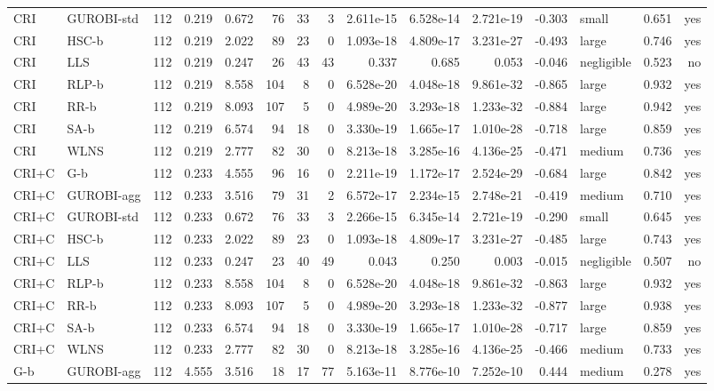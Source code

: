 \begin{table}[htbp]
\begin{tabular}{llrrrrrrrrrrlrr}
CRI & GUROBI-std & 112 & 0.219 & 0.672 & 76 & 33 & 3 & 2.611e-15 & 6.528e-14 & 2.721e-19 & -0.303 & small & 0.651 & yes \\
CRI & HSC-b & 112 & 0.219 & 2.022 & 89 & 23 & 0 & 1.093e-18 & 4.809e-17 & 3.231e-27 & -0.493 & large & 0.746 & yes \\
CRI & LLS & 112 & 0.219 & 0.247 & 26 & 43 & 43 & 0.337 & 0.685 & 0.053 & -0.046 & negligible & 0.523 & no \\
CRI & RLP-b & 112 & 0.219 & 8.558 & 104 & 8 & 0 & 6.528e-20 & 4.048e-18 & 9.861e-32 & -0.865 & large & 0.932 & yes \\
CRI & RR-b & 112 & 0.219 & 8.093 & 107 & 5 & 0 & 4.989e-20 & 3.293e-18 & 1.233e-32 & -0.884 & large & 0.942 & yes \\
CRI & SA-b & 112 & 0.219 & 6.574 & 94 & 18 & 0 & 3.330e-19 & 1.665e-17 & 1.010e-28 & -0.718 & large & 0.859 & yes \\
CRI & WLNS & 112 & 0.219 & 2.777 & 82 & 30 & 0 & 8.213e-18 & 3.285e-16 & 4.136e-25 & -0.471 & medium & 0.736 & yes \\
CRI+C & G-b & 112 & 0.233 & 4.555 & 96 & 16 & 0 & 2.211e-19 & 1.172e-17 & 2.524e-29 & -0.684 & large & 0.842 & yes \\
CRI+C & GUROBI-agg & 112 & 0.233 & 3.516 & 79 & 31 & 2 & 6.572e-17 & 2.234e-15 & 2.748e-21 & -0.419 & medium & 0.710 & yes \\
CRI+C & GUROBI-std & 112 & 0.233 & 0.672 & 76 & 33 & 3 & 2.266e-15 & 6.345e-14 & 2.721e-19 & -0.290 & small & 0.645 & yes \\
CRI+C & HSC-b & 112 & 0.233 & 2.022 & 89 & 23 & 0 & 1.093e-18 & 4.809e-17 & 3.231e-27 & -0.485 & large & 0.743 & yes \\
CRI+C & LLS & 112 & 0.233 & 0.247 & 23 & 40 & 49 & 0.043 & 0.250 & 0.003 & -0.015 & negligible & 0.507 & no \\
CRI+C & RLP-b & 112 & 0.233 & 8.558 & 104 & 8 & 0 & 6.528e-20 & 4.048e-18 & 9.861e-32 & -0.863 & large & 0.932 & yes \\
CRI+C & RR-b & 112 & 0.233 & 8.093 & 107 & 5 & 0 & 4.989e-20 & 3.293e-18 & 1.233e-32 & -0.877 & large & 0.938 & yes \\
CRI+C & SA-b & 112 & 0.233 & 6.574 & 94 & 18 & 0 & 3.330e-19 & 1.665e-17 & 1.010e-28 & -0.717 & large & 0.859 & yes \\
CRI+C & WLNS & 112 & 0.233 & 2.777 & 82 & 30 & 0 & 8.213e-18 & 3.285e-16 & 4.136e-25 & -0.466 & medium & 0.733 & yes \\
G-b & GUROBI-agg & 112 & 4.555 & 3.516 & 18 & 17 & 77 & 5.163e-11 & 8.776e-10 & 7.252e-10 & 0.444 & medium & 0.278 & yes \\

\end{tabular}
\end{table}
